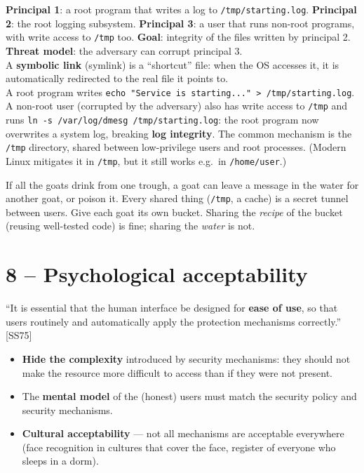 \begin{exbox}[title={Exercise: find the vulnerability --- symlink attack in \texttt{/tmp}}]
\textbf{Principal 1}: a root program that writes a log to \texttt{/tmp/starting.log}.
\textbf{Principal 2}: the root logging subsystem. \textbf{Principal 3}: a user that runs non-root
programs, with write access to \texttt{/tmp} too. \textbf{Goal}: integrity of the files written
by principal 2. \textbf{Threat model}: the adversary can corrupt principal 3. \\
A \textbf{symbolic link} (symlink) is a ``shortcut'' file: when the OS accesses it, it is
automatically redirected to the real file it points to. \\
A root program writes \texttt{echo "Service is starting..." > /tmp/starting.log}. A
non-root user (corrupted by the adversary) also has write access to \texttt{/tmp} and
runs \texttt{ln -s /var/log/dmesg /tmp/starting.log}: the root program now overwrites a
system log, breaking \textbf{log integrity}. The common mechanism is the \texttt{/tmp}
directory, shared between low-privilege users and root processes. (Modern Linux
mitigates it in \texttt{/tmp}, but it still works e.g.\ in \texttt{/home/user}.)
\end{exbox}

\begin{goatbox}
If all the goats drink from one trough, a goat can leave a message in the water for another goat,
or poison it. Every shared thing (\texttt{/tmp}, a cache) is a secret tunnel between users. Give
each goat its own bucket. Sharing the \emph{recipe} of the bucket (reusing well-tested code) is
fine; sharing the \emph{water} is not.
\end{goatbox}

\section{8 -- Psychological acceptability}

\begin{defnbox}[title=Psychological acceptability]
``It is essential that the human interface be designed for \textbf{ease of use}, so that
users routinely and automatically apply the protection mechanisms correctly.'' [SS75]
\end{defnbox}

\begin{propbox}[title=What it implies]
\begin{itemize}
  \item \textbf{Hide the complexity} introduced by security mechanisms: they should not
        make the resource more difficult to access than if they were not present.
  \item The \textbf{mental model} of the (honest) users must match the security policy
        and security mechanisms.
  \item \textbf{Cultural acceptability} --- not all mechanisms are acceptable everywhere
        (face recognition in cultures that cover the face, register of everyone who
        sleeps in a dorm).
\end{itemize}
\end{propbox}

